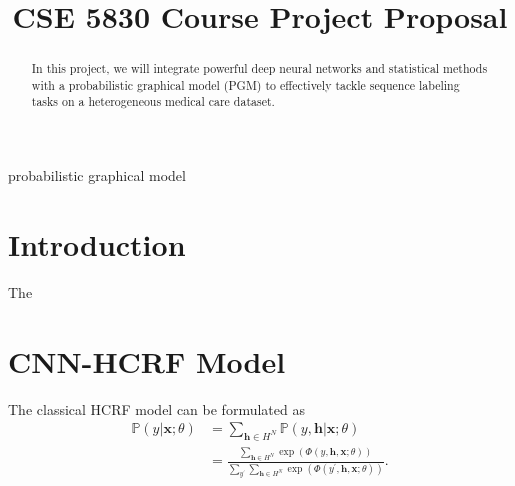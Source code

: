 \documentclass[conference]{IEEEtran}
\begin{document}
\title{CSE 5830 Course Project Proposal}

\author{
\and
{}
\and
{}
}

\maketitle

\begin{abstract}
In this project, we will integrate powerful deep neural networks and
statistical methods with a probabilistic graphical model (PGM) to effectively
tackle sequence labeling tasks on a heterogeneous medical care dataset.
\end{abstract}


\begin{IEEEkeywords}
probabilistic graphical model
\end{IEEEkeywords}


\section{Introduction}

The

\section{CNN-HCRF Model}

The classical HCRF model can be formulated as
\begin{align}
	\mathbb{P}(y| \mathbf{x}; \theta) & = \sum_{\mathbf{h} \in H^{N}} \mathbb{P}(y, \mathbf{h}| \mathbf{x}; \theta) \\
	& = \frac{\sum_{\mathbf{h}\in H^{N}} \exp(\Phi(y, \mathbf{h}, \mathbf{x}; \theta))}
	{\sum_{y^{'}} \sum_{\mathbf{h}\in H^{N}} \exp(\Phi(y^{'}, \mathbf{h}, \mathbf{x}; \theta))}.
\end{align}
\end{document}
